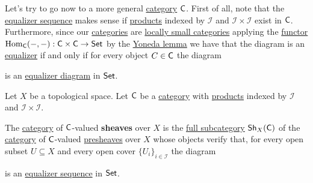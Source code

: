 \documentclass[../../../main]{subfiles}
\begin{document}
Let's try to go now to a more general \hyperref[def:category]{category} \(\mathsf{C}\).
First of all, note that the \hyperref[def:equaliser]{equalizer sequence} makes sense if \hyperref[def:categorical-product]{products} indexed by \(\mathcal{I}\) and \(\mathcal{I} \times \mathcal{I}\) exist in \(\mathsf{C}\).
Furthermore, since our \hyperref[def:category]{categories} are \hyperref[def:category]{locally small categories} applying the \hyperref[def:functor]{functor} \(\operatorname{Hom}_{\mathsf{C}}(-, -): \mathsf{C} \times \mathsf{C} \to \mathsf{Set}\) by the \hyperref[lemma:yoneda]{Yoneda lemma} we have that the diagram is an \hyperref[def:equaliser]{equalizer} if and only if for every object \(C \in \mathsf{C}\) the diagram
\begin{center}
\end{center}
is an \hyperref[def:equaliser]{equalizer diagram} in \(\mathsf{Set}\).

\begin{definition}[Sheaf] \label{def:sheaf}
  Let \(X\) be a topological space.
  Let \(\mathsf{C}\) be a \hyperref[def:category]{category} with \hyperref[def:categorical-product]{products} indexed by \(\mathcal{I}\) and \(\mathcal{I} \times \mathcal{I}\).

  The \hyperref[def:category]{category} of \(\mathsf{C}\)-valued \textbf{sheaves} over \(X\) is the \hyperref[def:subcategory]{full subcategory} \(\mathsf{Sh}_{X}(\mathsf{C})\) of the \hyperref[def:category]{category} of \(\mathsf{C}\)-valued \hyperref[def:presheaf]{presheaves} over \(X\) whose objects verify that, for every open subset \(U \subseteq X\) and every open cover \(\{U_{i}\}_{i \in \mathcal{I}}\) the diagram
  \begin{center}
  \end{center}
  is an \hyperref[def:equaliser]{equalizer sequence} in \(\mathsf{Set}\).
\end{definition}
\end{document}
